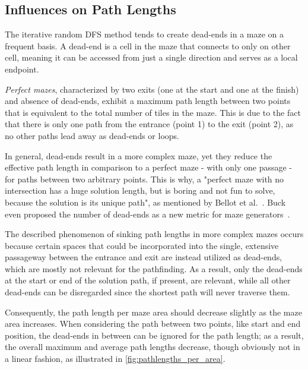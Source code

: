 \documentclass[3p,times,procedia]{elsarticle}
\begin{document}
\subsection{Influences on Path Lengths}
\label{subsec:path_lenghts}

The iterative random DFS method tends to create dead-ends in a maze on a frequent basis. A dead-end is a cell in the maze that connects to only on other cell, meaning it can be accessed from just a single direction and serves as a local endpoint.

\textit{Perfect mazes}, characterized by two exits (one at the start and one at the finish) and absence of dead-ends, exhibit a maximum path length between two points that is equivalent to the total number of tiles in the maze.
This is due to the fact that there is only one path from the entrance (point 1) to the exit (point 2), as no other paths lead away as dead-ends or loops.

In general, dead-ends result in a more complex maze, yet they reduce the effective path length in comparison to a perfect maze - with only one passage - for paths between two arbitrary points. This is why, a "perfect maze with no intersection has a huge solution length, but is boring and not fun to solve, because the solution is its unique path", as mentioned by Bellot et al.\ \cite{bellot2021generate}. Buck even proposed the number of dead-ends as a new metric for maze generators\ \cite{buck2015mazes}.

The described phenomenon of sinking path lengths in more complex mazes occurs because certain spaces that could be incorporated into the single, extensive passageway between the entrance and exit are instead utilized as dead-ends, which are mostly not relevant for the pathfinding. As a result, only the dead-ends at the start or end of the solution path, if present, are relevant, while all other dead-ends can be disregarded since the shortest path will never traverse them.

Consequently, the path length per maze area should decrease slightly as the maze area increases.
When considering the path between two points, like start and end position, the dead-ends in between can be ignored for the path length; as a result, the overall maximum and average path lengths decrease, though obviously not in a linear fashion, as illustrated in \autoref{fig:pathlengths_per_area}.
\end{document}
